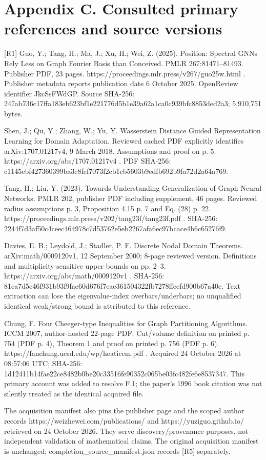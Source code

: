 \documentclass[10pt]{article}
\begin{document}
\section*{Appendix C. Consulted primary references and source versions}
[R1] Guo, Y.; Tang, H.; Ma, J.; Xu, H.; Wei, Z. (2025). Position: Spectral GNNs Rely Less on Graph Fourier Basis than Conceived. PMLR 267:81471–81493. Publisher PDF, 23 pages. https://proceedings.mlr.press/v267/guo25w.html . Publisher metadata reports publication date 6 October 2025. OpenReview identifier JkcSsFWdGP. Source SHA-256: 247ab736c17ffa183eb623bf1e221776d5b1e39a62a1ca0c939bfc8853ded2a3; 5,910,751 bytes.\par
[R2] Shen, J.; Qu, Y.; Zhang, W.; Yu, Y. Wasserstein Distance Guided Representation Learning for Domain Adaptation. Reviewed cached PDF explicitly identifies arXiv:1707.01217v4, 9 March 2018. Assumptions and proof on p. 5. https://arxiv.org/abs/1707.01217v4 . PDF SHA-256: c1145ebf427360399ba3c8fef7073f2cb1cb5603b9edfb692b9fa72d2a64a769.\par
[R3] Tang, H.; Liu, Y. (2023). Towards Understanding Generalization of Graph Neural Networks. PMLR 202, publisher PDF including supplement, 46 pages. Reviewed radius assumptions p. 3, Proposition 4.15 p. 7 and Eq. (28) p. 22. https://proceedings.mlr.press/v202/tang23f/tang23f.pdf . SHA-256: 2244f7d3af50c4ceec464978c7d53762e5eb2267afa6ec97bcace4b6c65276f9.\par
[R4] Davies, E. B.; Leydold, J.; Stadler, P. F. Discrete Nodal Domain Theorems. arXiv:math/0009120v1, 12 September 2000; 8-page reviewed version. Definitions and multiplicity-sensitive upper bounds on pp. 2–3. https://arxiv.org/abs/math/0009120v1 . SHA-256: 81ca7d5e46f931b93f9fae60d676f7eae361504322fb7278ffcefd900b67a40e. Text extraction can lose the eigenvalue-index overbars/underbars; no unqualified identical weak/strong bound is attributed to this reference.\par
[R5] Chung, F. Four Cheeger-type Inequalities for Graph Partitioning Algorithms. ICCM 2007, author-hosted 22-page PDF. Cut/volume definition on printed p. 754 (PDF p. 4), Theorem 1 and proof on printed p. 756 (PDF p. 6). https://fanchung.ucsd.edu/wp/heaticcm.pdf . Acquired 24 October 2026 at 08:57:06 UTC; SHA-256: 1d12411b14fae22ce8482b0be20c33516fe90352c065be03fc482fe6e8537347. This primary account was added to resolve F.1; the paper’s 1996 book citation was not silently treated as the identical acquired file.\par
The acquisition manifest also pins the publisher page and the scoped author records https://weizhewei.com/publications/ and https://yuziguo.github.io/ retrieved on 24 October 2026. They serve discovery/provenance purposes, not independent validation of mathematical claims. The original acquisition manifest is unchanged; completion\_source\_manifest.json records [R5] separately.\par
\end{document}
